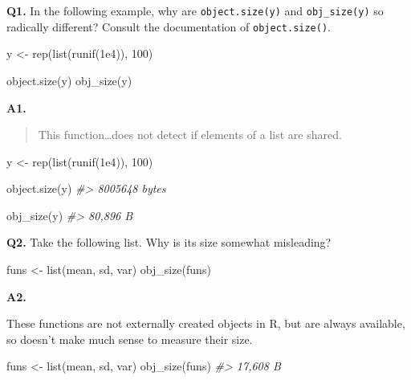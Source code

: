 \documentclass[
]{book}
\newenvironment{Shaded}{\begin{snugshade}}{\end{snugshade}}
\newcommand{\CommentTok}[1]{\textcolor[rgb]{0.56,0.35,0.01}{\textit{#1}}}
\newcommand{\DecValTok}[1]{\textcolor[rgb]{0.00,0.00,0.81}{#1}}
\newcommand{\FloatTok}[1]{\textcolor[rgb]{0.00,0.00,0.81}{#1}}
\newcommand{\FunctionTok}[1]{\textcolor[rgb]{0.00,0.00,0.00}{#1}}
\newcommand{\NormalTok}[1]{#1}
\newcommand{\OtherTok}[1]{\textcolor[rgb]{0.56,0.35,0.01}{#1}}
\begin{document}
\textbf{Q1.} In the following example, why are \texttt{object.size(y)} and \texttt{obj\_size(y)} so radically different? Consult the documentation of \texttt{object.size()}.

\begin{Shaded}
\begin{Highlighting}[]
\NormalTok{y }\OtherTok{\textless{}{-}} \FunctionTok{rep}\NormalTok{(}\FunctionTok{list}\NormalTok{(}\FunctionTok{runif}\NormalTok{(}\FloatTok{1e4}\NormalTok{)), }\DecValTok{100}\NormalTok{)}

\FunctionTok{object.size}\NormalTok{(y)}
\FunctionTok{obj\_size}\NormalTok{(y)}
\end{Highlighting}
\end{Shaded}

\textbf{A1.}

\begin{quote}
This function\ldots does not detect if elements of a list are shared.
\end{quote}

\begin{Shaded}
\begin{Highlighting}[]
\NormalTok{y }\OtherTok{\textless{}{-}} \FunctionTok{rep}\NormalTok{(}\FunctionTok{list}\NormalTok{(}\FunctionTok{runif}\NormalTok{(}\FloatTok{1e4}\NormalTok{)), }\DecValTok{100}\NormalTok{)}

\FunctionTok{object.size}\NormalTok{(y)}
\CommentTok{\#\textgreater{} 8005648 bytes}

\FunctionTok{obj\_size}\NormalTok{(y)}
\CommentTok{\#\textgreater{} 80,896 B}
\end{Highlighting}
\end{Shaded}

\textbf{Q2.} Take the following list. Why is its size somewhat misleading?

\begin{Shaded}
\begin{Highlighting}[]
\NormalTok{funs }\OtherTok{\textless{}{-}} \FunctionTok{list}\NormalTok{(mean, sd, var)}
\FunctionTok{obj\_size}\NormalTok{(funs)}
\end{Highlighting}
\end{Shaded}

\textbf{A2.}

These functions are not externally created objects in R, but are always available, so doesn't make much sense to measure their size.

\begin{Shaded}
\begin{Highlighting}[]
\NormalTok{funs }\OtherTok{\textless{}{-}} \FunctionTok{list}\NormalTok{(mean, sd, var)}
\FunctionTok{obj\_size}\NormalTok{(funs)}
\CommentTok{\#\textgreater{} 17,608 B}
\end{Highlighting}
\end{Shaded}
\end{document}
